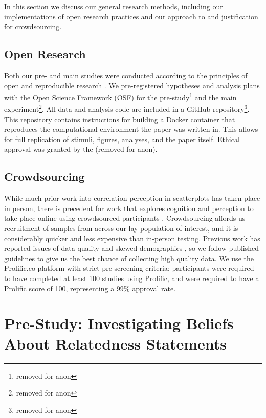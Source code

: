\documentclass[manuscript,screen,review,anonymous]{acmart}
\begin{document}
In this section we discuss our general research methods, including our
implementations of open research practices and our approach to and
justification for crowdsourcing.

\subsection{Open Research}\label{sec-open-research}

Both our pre- and main studies were conducted according to the
principles of open and reproducible research \citep{ayris_2018}. We
pre-registered hypotheses and analysis plans with the Open Science
Framework (OSF) for the pre-study\footnote{removed for anon} and the
main experiment\footnote{removed for anon}. All data and analysis code
are included in a GitHub repository\footnote{removed for anon}. This
repository contains instructions for building a Docker container
\citep{merkel_2014} that reproduces the computational environment the
paper was written in. This allows for full replication of stimuli,
figures, analyses, and the paper itself. Ethical approval was granted by
the (removed for anon).

\subsection{Crowdsourcing}\label{sec-crowdsourcing}

While much prior work into correlation perception in scatterplots has
taken place in person, there is precedent for work that explores
cognition and perception to take place online using crowdsourced
participants \citep{xiong_2022}. Crowdsourcing affords us recruitment of
samples from across our lay population of interest, and it is
considerably quicker and less expensive than in-person testing. Previous
work has reported issues of data quality and skewed demographics
\citep{chmielewski_2020, charalambides_2021, peer_2021}, so we follow
published guidelines \citep{peer_2021} to give us the best chance of
collecting high quality data. We use the Prolific.co platform
\citep{prolific} with strict pre-screening criteria; participants were
required to have completed at least 100 studies using Prolific, and were
required to have a Prolific score of 100, representing a 99\% approval
rate.

\section{Pre-Study: Investigating Beliefs About Relatedness
Statements}\label{sec-pre-study}
\end{document}
